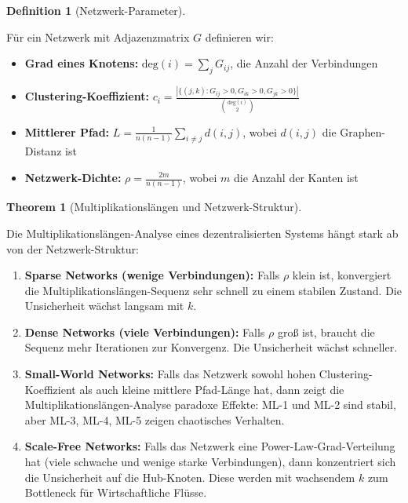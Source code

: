 \documentclass[a4paper,12pt]{article}
\theoremstyle{definition}
\newtheorem{definition}{Definition}
\newtheorem{theorem}{Theorem}
\begin{document}
\begin{definition}[Netzwerk-Parameter]
\label{def:netzwerk_parameter}

Für ein Netzwerk mit Adjazenzmatrix $G$ definieren wir:

\begin{itemize}
\item \textbf{Grad eines Knotens:} $\text{deg}(i) = \sum_j G_{ij}$, die Anzahl der Verbindungen
\item \textbf{Clustering-Koeffizient:} $c_i = \frac{|\{(j,k) : G_{ij} > 0, G_{ik} > 0, G_{jk} > 0\}|}{\binom{\text{deg}(i)}{2}}$
\item \textbf{Mittlerer Pfad:} $L = \frac{1}{n(n-1)} \sum_{i \neq j} d(i,j)$, wobei $d(i,j)$ die Graphen-Distanz ist
\item \textbf{Netzwerk-Dichte:} $\rho = \frac{2m}{n(n-1)}$, wobei $m$ die Anzahl der Kanten ist
\end{itemize}

\end{definition}

\begin{theorem}[Multiplikationslängen und Netzwerk-Struktur]
\label{thm:ml_netzwerk}

Die Multiplikationslängen-Analyse eines dezentralisierten Systems hängt stark ab von der Netzwerk-Struktur:

\begin{enumerate}

\item \textbf{Sparse Networks (wenige Verbindungen):} Falls $\rho$ klein ist, konvergiert die Multiplikationslängen-Sequenz sehr schnell zu einem stabilen Zustand. Die Unsicherheit wächst langsam mit $k$.

\item \textbf{Dense Networks (viele Verbindungen):} Falls $\rho$ groß ist, braucht die Sequenz mehr Iterationen zur Konvergenz. Die Unsicherheit wächst schneller.

\item \textbf{Small-World Networks:} Falls das Netzwerk sowohl hohen Clustering-Koeffizient als auch kleine mittlere Pfad-Länge hat, dann zeigt die Multiplikationslängen-Analyse paradoxe Effekte: ML-1 und ML-2 sind stabil, aber ML-3, ML-4, ML-5 zeigen chaotisches Verhalten.

\item \textbf{Scale-Free Networks:} Falls das Netzwerk eine Power-Law-Grad-Verteilung hat (viele schwache und wenige starke Verbindungen), dann konzentriert sich die Unsicherheit auf die Hub-Knoten. Diese werden mit wachsendem $k$ zum Bottleneck für Wirtschaftliche Flüsse.

\end{enumerate}

\end{theorem}
\end{document}
